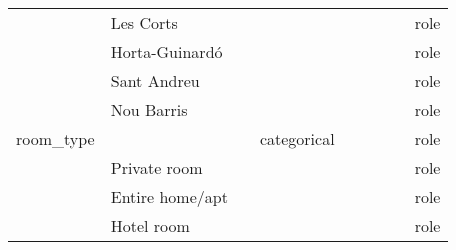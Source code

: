 \begin{center}
\begin{longtable}{@{}lllllllll@{}}
                            & Les Corts                   &                                   &             &                &                             &                     &         & role \\
                            & Horta-Guinardó              &                                   &             &                &                             &                     &         & role \\
                            & Sant Andreu                 &                                   &             &                &                             &                     &         & role \\
                            & Nou Barris                  &                                   &             &                &                             &                     &         & role \\
room\_type                  &                             &                                   & categorical &                &                             &                     &         & role \\
                            & Private room                &                                   &             &                &                             &                     &         & role \\
                            & Entire home/apt  &                                   &             &                &                             &                     &         & role \\
                                                        & Hotel room  &                                   &             &                &                             &                     &         & role \\


\end{longtable}
\end{center}
